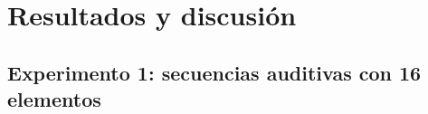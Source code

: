 \section{Resultados y discusión}

\subsection{Experimento 1: secuencias auditivas con 16 elementos}


